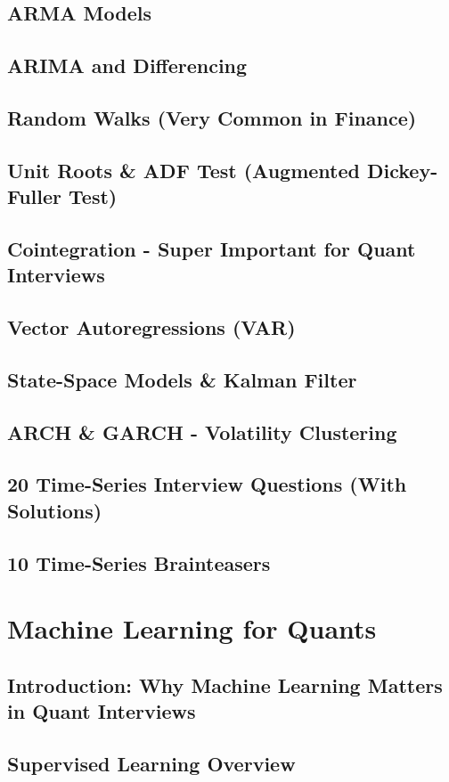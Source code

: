 \documentclass{report}
\begin{document}
\subsection*{ARMA Models}
\subsection*{ARIMA and Differencing}
\subsection*{Random Walks (Very Common in Finance)}
\subsection*{Unit Roots \& ADF Test (Augmented Dickey-Fuller Test)}
\subsection*{Cointegration - Super Important for Quant Interviews}
\subsection*{Vector Autoregressions (VAR)}
\subsection*{State-Space Models \& Kalman Filter}
\subsection*{ARCH \& GARCH - Volatility Clustering}
\subsection*{20 Time-Series Interview Questions (With Solutions)}
\subsection*{10 Time-Series Brainteasers}

\section{Machine Learning for Quants}
\subsection*{Introduction: Why Machine Learning Matters in Quant Interviews}
\subsection*{Supervised Learning Overview}
\end{document}
